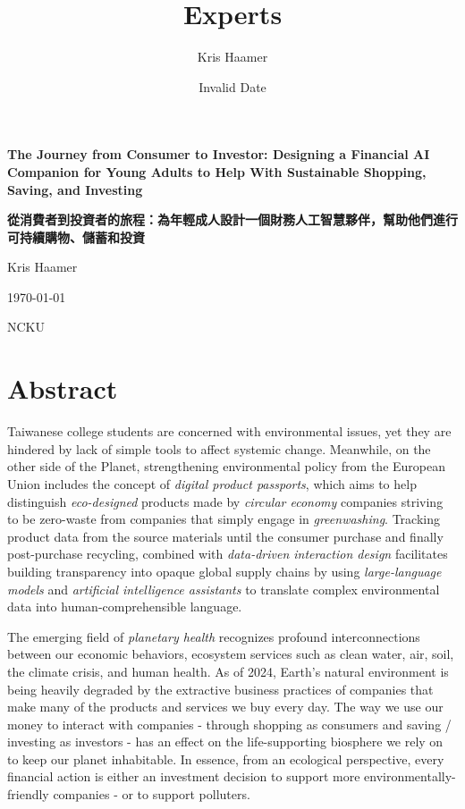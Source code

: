 \documentclass[
  letterpaper,
  DIV=11,
  numbers=noendperiod]{scrartcl}
\title{Experts}
\author{Kris Haamer}
\date{Invalid Date}
\renewcommand*\contentsname{Table of contents}
\newcommand\contentsname{Table of contents}
\begin{document}
\maketitle

\renewcommand*\contentsname{Table of contents}
{
\hypersetup{linkcolor=}
\setcounter{tocdepth}{3}
\tableofcontents
}

\begin{titlepage}
    \centering
    \vspace*{1in}
    {\LARGE \textbf{The Journey from Consumer to Investor: Designing a Financial AI Companion for Young Adults to Help With Sustainable Shopping, Saving, and Investing} \par}
    \vspace{0.5in}
    {\LARGE \textbf{從消費者到投資者的旅程：為年輕成人設計一個財務人工智慧夥伴，幫助他們進行可持續購物、儲蓄和投資} \par}
    \vspace{0.5in}
    {\Large Kris Haamer \par}
    \vfill
    {\Large \today \par}
    \vspace{1.5in}
    {\Large NCKU \par}
\end{titlepage}

\newpage

\section{Abstract}\label{abstract}

Taiwanese college students are concerned with environmental issues, yet
they are hindered by lack of simple tools to affect systemic change.
Meanwhile, on the other side of the Planet, strengthening environmental
policy from the European Union includes the concept of \emph{digital
product passports}, which aims to help distinguish \emph{eco-designed}
products made by \emph{circular economy} companies striving to be
zero-waste from companies that simply engage in \emph{greenwashing}.
Tracking product data from the source materials until the consumer
purchase and finally post-purchase recycling, combined with
\emph{data-driven interaction design} facilitates building transparency
into opaque global supply chains by using \emph{large-language models}
and \emph{artificial intelligence assistants} to translate complex
environmental data into human-comprehensible language.

The emerging field of \emph{planetary health} recognizes profound
interconnections between our economic behaviors, ecosystem services such
as clean water, air, soil, the climate crisis, and human health. As of
2024, Earth's natural environment is being heavily degraded by the
extractive business practices of companies that make many of the
products and services we buy every day. The way we use our money to
interact with companies - through shopping as consumers and saving /
investing as investors - has an effect on the life-supporting biosphere
we rely on to keep our planet inhabitable. In essence, from an
ecological perspective, every financial action is either an investment
decision to support more environmentally-friendly companies - or to
support polluters.
\end{document}
